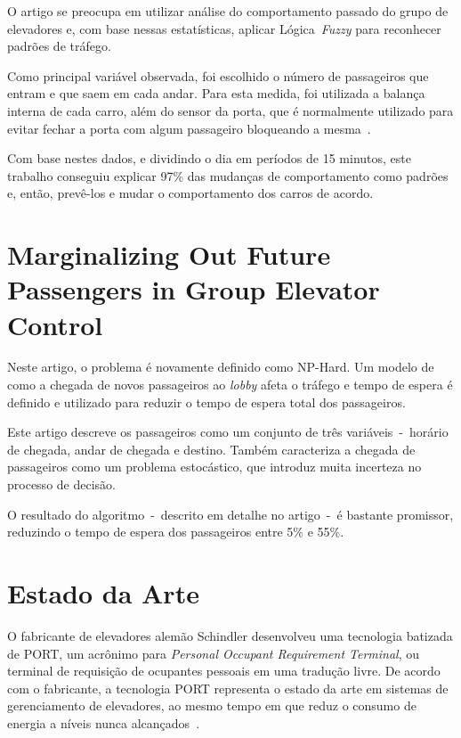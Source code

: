 O artigo  se preocupa em utilizar análise do comportamento passado do grupo de
elevadores e, com base nessas estatísticas, aplicar Lógica~\textit{Fuzzy} para
reconhecer padrões de tráfego.

Como principal variável observada, foi escolhido o número de passageiros que
entram e que saem em cada andar. Para esta medida, foi utilizada a balança
interna de cada carro, além do sensor da porta, que é normalmente utilizado para
evitar fechar a porta com algum passageiro bloqueando a mesma~\cite{marja97}.

Com base nestes dados, e dividindo o dia em períodos de 15 minutos, este
trabalho conseguiu explicar 97\% das mudanças de comportamento como padrões e,
então, prevê-los e mudar o comportamento dos carros de acordo.

\section{\label{section:dblp}Marginalizing Out Future Passengers in Group Elevator
Control~\cite{DBLP:journals/corr/abs-1212-2499}}

Neste artigo, o problema é novamente definido como NP-Hard. Um modelo de como a
chegada de novos passageiros ao \textit{lobby} afeta o tráfego e tempo de espera
é definido e utilizado para reduzir o tempo de espera total dos passageiros.

Este artigo descreve os passageiros como um conjunto de três variáveis~-~horário
de chegada, andar de chegada e destino. Também caracteriza a chegada de
passageiros como um problema estocástico, que introduz muita incerteza no
processo de decisão.

O resultado do algoritmo~-~descrito em detalhe no artigo~-~é bastante
promissor, reduzindo o tempo de espera dos passageiros entre 5\% e 55\%.

\section{\label{section:art}Estado da Arte}

O fabricante de elevadores alemão Schindler desenvolveu uma tecnologia batizada
de PORT, um acrônimo para \textit{Personal Occupant Requirement Terminal}, ou
terminal de requisição de ocupantes pessoais em uma tradução livre. De acordo
com o fabricante, a tecnologia PORT representa o estado da arte em sistemas de
gerenciamento de elevadores, ao mesmo tempo em que reduz o consumo de energia a
níveis nunca alcançados~\cite{Schindler14}.


